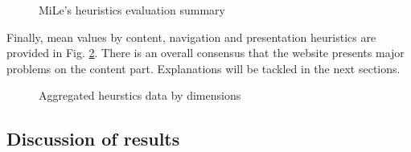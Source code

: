 \begin{figure}[!ht]
    \begin{minipage}{\linewidth}
        \centering
        \captionsetup{justification=centering}
        \caption{MiLe's heuristics evaluation summary}
        \label{BarsMileCrop}
    \end{minipage}
\end{figure}

\pagebreak

Finally, mean values by content, navigation and presentation heuristics are provided in Fig. \ref{BarsAggregated}. There is an overall consensus that the website presents major problems on the content part. Explanations will be tackled in the next sections. 

\begin{figure}[!ht]
    \begin{minipage}{\linewidth}
        \centering
        \captionsetup{justification=centering}
        \caption{Aggregated heurstics data by dimensions}
        \label{BarsAggregated}
    \end{minipage}
\end{figure}

\subsection{Discussion of results}
